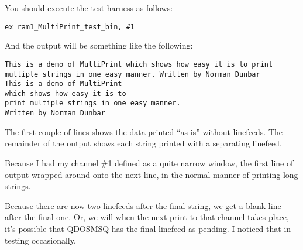 You should execute the test harness as follows:

\begin{lstlisting}[frame=none,numbers=none,caption={Executing the Multiprint Test Harness}]
ex ram1_MultiPrint_test_bin, #1
\end{lstlisting}

And the output will be something like the following:

\begin{lstlisting}[frame=none,numbers=none,caption={Results of the Multiprint Test Harness}]
This is a demo of MultiPrint which shows how easy it is to print 
multiple strings in one easy manner. Written by Norman Dunbar
This is a demo of MultiPrint 
which shows how easy it is to 
print multiple strings in one easy manner. 
Written by Norman Dunbar

\end{lstlisting}

The first couple of lines shows the data printed ``as is'' without linefeeds. The remainder of the output shows each string printed with a separating linefeed.

Because I had my channel \#1 defined as a quite narrow window, the first line of output wrapped around onto the next line, in the normal manner of printing long strings.

Because there are now two linefeeds after the final string, we get a blank line after the final one. Or, we will when the next print to that channel takes place, it's possible that QDOSMSQ has the final linefeed as pending. I noticed that in testing occasionally.
